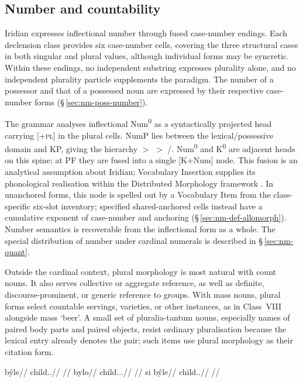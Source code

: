 \subsection{Number and countability}
\label{sec:nm-num}

Iridian expresses inflectional number through fused case-number endings.
Each declension class provides six case-number cells, covering the three
structural cases in both singular and plural values, although individual
forms may be syncretic. Within these endings, no independent substring
expresses plurality alone, and no independent plurality particle supplements
the paradigm. The number of a possessor and that of a possessed noun are
expressed by their respective case-number forms (§\,\ref{sec:nm-poss-number}).

The grammar analyses inflectional Num\textsuperscript{0} as a syntactically
projected head carrying [\textsc{+pl}] in the plural cells. NumP lies
between the lexical/possessive domain and KP, giving the hierarchy
 $>$  $>$ /.
Num\textsuperscript{0} and K\textsuperscript{0} are adjacent heads on
this spine; at PF they are fused into a
single [K$+$Num] node. This fusion is an analytical assumption about Iridian;
Vocabulary Insertion supplies its phonological realisation within the
Distributed Morphology framework \cite[§\,2.3]{embicknoyer2007}. In unanchored
forms, this node is spelled out by a Vocabulary Item from the class-specific
six-slot inventory; specified shared-anchored cells instead have a cumulative
exponent of case-number and anchoring (§\,\ref{sec:nm-def-allomorph}).
Number semantics is recoverable from the inflectional form as a whole.
The special distribution of number under cardinal numerals is described in
§\,\ref{sec:nm-quant}.

Outside the cardinal context, plural morphology is most natural with count nouns.
It also serves collective or aggregate reference, as well as definite,
discourse-prominent, or generic reference to groups.
With mass nouns, plural forms select countable servings, varieties, or other
instances, as in Class~VIII  alongside mass  `beer'.
A small set of pluralia-tantum nouns, especially names of
paired body parts and paired objects, resist ordinary pluralisation because
the lexical entry already denotes the pair; such items use plural morphology
as their citation form.

\pex
\a
\begingl
\gla býle//
\glb child.\Dir{}.\Pl{}//
\glft {}//
\endgl
\a
\begingl
\gla bylo//
\glb child.\Dir{}.\Sg{}.\Def{}//
\glft {}//
\endgl
\a
\begingl
\gla si býle//
\glb \Sanch{} child.\Dir{}.\Pl{}//
\glft {}//
\endgl
\xe

